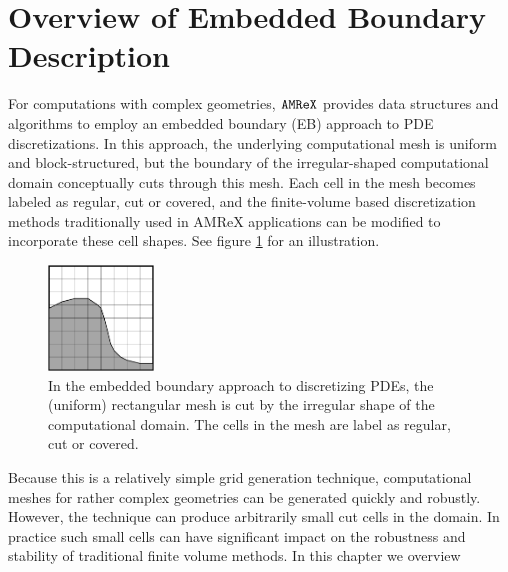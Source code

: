 \newcommand{\xbold}{{\bf x}}
\newcommand{\ibold}{{\bf i}}
\newcommand{\jbold}{{\bf j}}
\newcommand{\kbold}{{\bf k}}
\newcommand{\nbold}{{\bf k}}
\newcommand{\cbold}{{\bf k}}
\newcommand{\ebis}{{\tt EBIndexSpace}}
\newcommand{\baseif}{{\tt BaseIF}}
\newcommand{\sphereif}{{\tt SphereIF}}
\newcommand{\transformif}{{\tt TransformIF}}
\newcommand{\latheif}{{\tt LatheIF}}
\newcommand{\unionif}{{\tt UnionIF}}
\newcommand{\intersectionif}{{\tt IntersectionIF}}
\newcommand{\geom}{{\tt GeometryShop}}
\newcommand{\parm}{{\tt ParmParse}}

\section{Overview of Embedded Boundary Description}
\label{sec:EB:EBOverview}

For computations with complex geometries, $\tt{AMReX}$ provides data
structures and algorithms to employ an embedded boundary (EB) approach to
PDE discretizations.    In this approach, the underlying computational
mesh is uniform and block-structured, but the boundary of the irregular-shaped
computational domain conceptually cuts through this mesh.  Each cell in the mesh
becomes labeled as regular, cut or covered, and the finite-volume based
discretization methods traditionally used in AMReX applications can be
modified to incorporate these cell shapes.  See figure \ref{fig::ebexample}
for an illustration.
\begin{figure}[h]
  \centering
  \includegraphics[width=0.25\textwidth]{./EB/EB_example.pdf}
  \caption{\label{fig::ebexample}In the embedded boundary approach to
    discretizing PDEs, the (uniform) rectangular mesh is cut by the
    irregular shape of the computational domain.  The cells in the
    mesh are label as regular, cut or covered.}
\end{figure}
Because this is a relatively simple grid
generation technique, computational meshes for rather complex geometries
can be generated quickly and robustly.  However, the technique 
can produce arbitrarily small cut cells in the domain.  In practice such small
cells can have significant impact on the robustness and stability of
traditional finite volume methods.  In this chapter we overview
